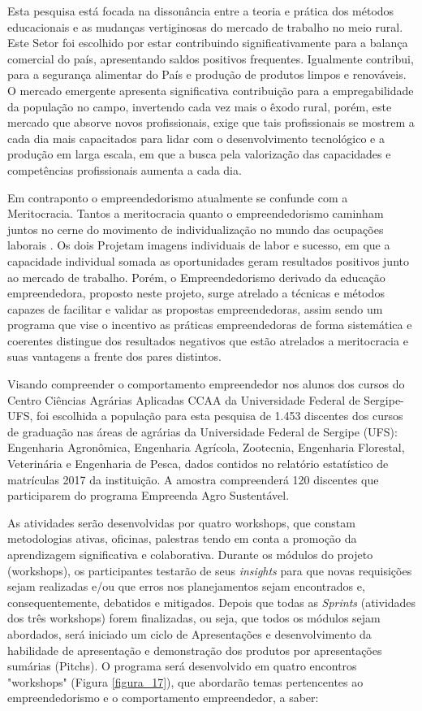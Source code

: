 Esta pesquisa está focada na dissonância entre a teoria e prática dos métodos educacionais e as mudanças vertiginosas do mercado de trabalho no meio rural. Este Setor foi escolhido por estar contribuindo significativamente para a balança comercial do país, apresentando saldos positivos frequentes. Igualmente contribui, para a segurança alimentar do País e produção de produtos limpos e renováveis. O mercado emergente apresenta significativa contribuição para a empregabilidade da população no campo, invertendo cada vez mais o êxodo rural, porém, este mercado que absorve novos profissionais, exige que tais profissionais se mostrem a cada dia mais capacitados para lidar com o desenvolvimento tecnológico e a produção em larga escala, em que a busca pela valorização das capacidades e competências profissionais aumenta a cada dia. 

Em contraponto o empreendedorismo atualmente se confunde com a Meritocracia. Tantos a meritocracia quanto o empreendedorismo caminham juntos no cerne do movimento de individualização no mundo das ocupações laborais \cite{costa_novo_2019}. Os dois  Projetam imagens individuais de labor e sucesso, em que a capacidade individual somada as oportunidades geram resultados positivos junto ao mercado de trabalho. Porém, o Empreendedorismo derivado da educação empreendedora, proposto neste projeto, surge atrelado a técnicas e métodos capazes de facilitar e validar as propostas empreendedoras, assim sendo um programa que vise o incentivo as práticas empreendedoras de forma sistemática e coerentes distingue dos resultados negativos que estão atrelados a meritocracia e suas vantagens a frente dos pares distintos.

Visando compreender o comportamento empreendedor nos alunos dos cursos do Centro Ciências Agrárias Aplicadas CCAA da Universidade Federal de Sergipe-UFS, foi escolhida a população para esta pesquisa de 1.453 discentes dos cursos de graduação nas áreas de agrárias da Universidade Federal de Sergipe (UFS): Engenharia Agronômica, Engenharia Agrícola, Zootecnia, Engenharia Florestal, Veterinária e Engenharia de Pesca, dados contidos no relatório estatístico de matrículas 2017 da instituição. A amostra compreenderá  120 discentes que participarem do programa Empreenda Agro Sustentável.

As atividades serão desenvolvidas por quatro workshops, que constam metodologias ativas, oficinas, palestras tendo em conta a promoção da aprendizagem significativa e colaborativa. Durante os módulos do projeto (workshops), os participantes testarão de seus \textit{insights} para que novas requisições sejam realizadas e/ou que erros nos planejamentos sejam encontrados e, consequentemente, debatidos e mitigados. Depois que todas as \textit{Sprints} (atividades dos três workshops) forem finalizadas, ou seja, que todos os módulos sejam abordados, será iniciado um ciclo de Apresentações e desenvolvimento da habilidade de apresentação e demonstração dos produtos por apresentações sumárias (Pitchs). O programa será desenvolvido em quatro encontros "workshops" (Figura \ref{figura_17}), que abordarão temas pertencentes ao empreendedorismo e o comportamento empreendedor, a saber: 


